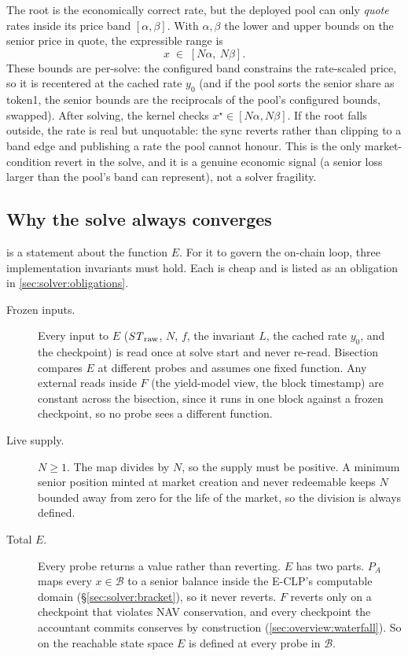 The root is the economically correct rate, but the deployed pool can only
\emph{quote} rates inside its price band $[\alpha, \beta]$. With $\alpha,
\beta$ the lower and upper bounds on the senior price in quote, the
expressible range is
\begin{equation}
  x \;\in\; [N\alpha,\ N\beta].
\end{equation}
These bounds are per-solve: the configured band constrains the
rate-scaled price, so it is recentered at the cached rate $y_0$ (and if
the pool sorts the senior share as token1, the senior bounds are the
reciprocals of the pool's configured bounds, swapped). After solving,
the kernel checks $x^\star \in [N\alpha, N\beta]$. If the root
falls outside, the rate is real but unquotable: the sync reverts rather than clipping to a band edge and
publishing a rate the pool cannot honour. This is the only
market-condition revert in the solve, and it is a genuine economic
signal (a senior loss larger than the pool's band can represent), not a
solver fragility.

\subsection{Why the solve always converges}
\label{sec:solver:convergence}

 is a statement about the function $E$. For it to govern
the on-chain loop, three implementation invariants must hold. Each is
cheap and is listed as an obligation in \cref{sec:solver:obligations}.

\begin{description}
  \item[Frozen inputs.] Every input to $E$ ($\mathit{ST}_{\mathrm{raw}}$, $N$, $f$, the
    invariant $L$, the cached rate $y_0$, and the checkpoint) is read
    once at solve start and never re-read. Bisection compares $E$ at
    different probes and assumes one fixed function. Any external reads
    inside $F$ (the yield-model view, the block timestamp) are constant
    across the bisection, since it runs in one block against a frozen
    checkpoint, so no probe sees a different function.
  \item[Live supply.] $N \geq 1$. The map divides by $N$, so the supply
    must be positive. A minimum senior position minted at market
    creation and never redeemable keeps $N$ bounded away from zero for
    the life of the market, so the division is always defined.
  \item[Total $E$.] Every probe returns a value rather than reverting.
    $E$ has two parts. $P_A$ maps every $x \in \mathcal{B}$ to a senior
    balance inside the E-CLP's computable domain
    (\S\ref{sec:solver:bracket}), so it never reverts. $F$ reverts only
    on a checkpoint that violates NAV conservation, and every checkpoint
    the accountant commits conserves by construction
    (\cref{sec:overview:waterfall}). So on the reachable state space $E$
    is defined at every probe in $\mathcal{B}$.
\end{description}

